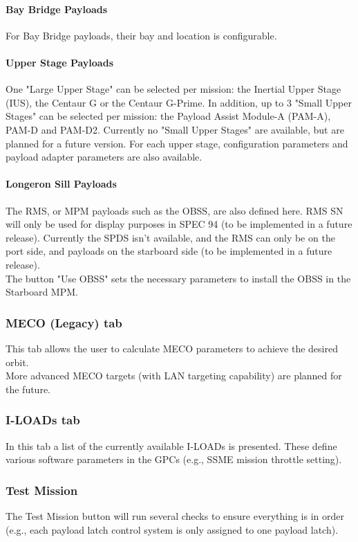 \documentclass[Space_Shuttle_Vessel_Manual.tex]{subfiles}
\begin{document}
\begin{multicols*}{2}
\paragraph{Bay Bridge Payloads}
For Bay Bridge payloads, their bay and location is configurable.

\paragraph{Upper Stage Payloads}
One "Large Upper Stage" can be selected per mission: the Inertial Upper Stage (IUS), the Centaur G or the Centaur G-Prime. In addition, up to 3 "Small Upper Stages" can be selected per mission: the Payload Assist Module-A (PAM-A), PAM-D and PAM-D2. Currently no "Small Upper Stages" are available, but are planned for a future version. For each upper stage, configuration parameters and payload adapter parameters are also available.

\paragraph{Longeron Sill Payloads}
The RMS, or MPM payloads such as the OBSS, are also defined here. RMS SN will only be used for display purposes in SPEC 94 (to be implemented in a future release). Currently the SPDS isn't available, and the RMS can only be on the port side, and payloads on the starboard side (to be implemented in a future release).\\
The button "Use OBSS" sets the necessary parameters to install the OBSS in the Starboard MPM.


\subsubsection{MECO (Legacy) tab}
\label{sec:meco-legacy}
This tab allows the user to calculate MECO parameters to achieve the desired orbit.\\
More advanced MECO targets (with LAN targeting capability) are planned for the future.


\subsubsection{I-LOADs tab}
In this tab a list of the currently available I-LOADs is presented. These define various software parameters in the GPCs (e.g., SSME mission throttle setting).


\subsubsection{Test Mission}
The Test Mission button will run several checks to ensure everything is in order (e.g., each payload latch control system is only assigned to one payload latch).



\end{multicols*}
\end{document}
